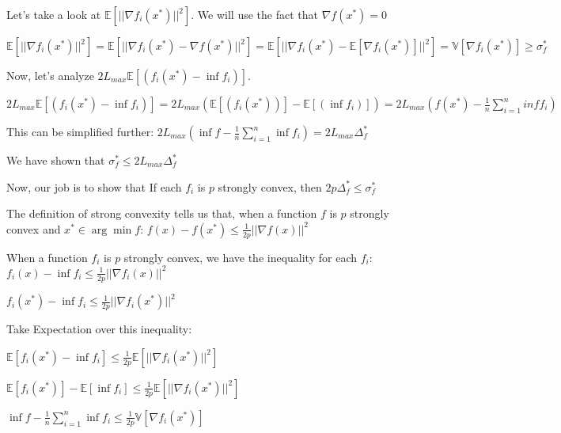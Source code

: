Let's take a look at $\mathbb{E}[||\nabla f_i(x^*)||^2]$. We will use the fact that $\nabla f(x^*) = 0$

$\mathbb{E}[||\nabla f_i(x^*)||^2]  =  \mathbb{E}[||\nabla f_i(x^*) - \nabla f(x^*)||^2] = \mathbb{E}[||\nabla f_i(x^*) - \mathbb{E}[\nabla f_i(x^*)]||^2] = \mathbb{V}[\nabla f_i(x^*)]  \geq \sigma_f^*$ \newline 

Now, let's analyze $2L_{max}  \mathbb{E}[(f_i(x^*) - \inf f_i)]$. \newline 

$2L_{max}  \mathbb{E}[(f_i(x^*) - \inf f_i)] = 2L_{max} (\mathbb{E}[(f_i(x^*))] - \mathbb{E}[(\inf f_i)]) = 2L_{max} (f(x^*) - \frac{1}{n} \sum_{i=1}^{n} inf f_i)$

This can be simplified further: \newline 
$2L_{max} (\inf f - \frac{1}{n} \sum_{i=1}^{n} \inf f_i) = 2L_{max} \Delta^*_f$ \newline 

We have shown that $\sigma_f^* \leq 2L_{max} \Delta^*_f$


Now, our job is to show that If each $f_i$ is $p$ strongly convex, then $2p\Delta^*_f \leq \sigma_f^*$ \newline 

The definition of strong convexity tells us that, when a function $f$ is $p$ strongly convex and $x^* \in \arg \min f$: \newline 
$f(x) - f(x^*) \leq \frac{1}{2p} ||\nabla f(x)||^2$


When a function $f_i$ is $p$ strongly convex, we have the inequality for each $f_i$: \newline 
$f_i(x) - \inf f_i \leq \frac{1}{2p} ||\nabla f_i(x)||^2$ \newline 

$f_i(x^*) - \inf f_i \leq \frac{1}{2p} ||\nabla f_i(x^*)||^2$

Take Expectation over this inequality: \newline 

$\mathbb{E} [f_i(x^*) - \inf f_i] \leq \frac{1}{2p} \mathbb{E} [||\nabla f_i(x^*)||^2]$ \newline 

$\mathbb{E} [f_i(x^*)] - \mathbb{E} [\inf f_i] \leq \frac{1}{2p} \mathbb{E} [||\nabla f_i(x^*)||^2]$ \newline 

$\inf f - \frac{1}{n} \sum_{i=1}^{n} \inf f_i \leq \frac{1}{2p} \mathbb{V} [\nabla f_i(x^*)]$ \newline 

